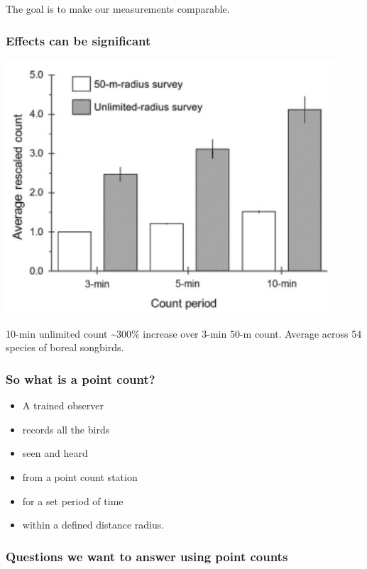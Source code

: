 \documentclass[12pt,]{book}
\providecommand{\tightlist}{%
  \setlength{\itemsep}{0pt}\setlength{\parskip}{0pt}}
\begin{document}
The goal is to make our measurements comparable.

\hypertarget{effects-can-be-significant}{%
\subsubsection{Effects can be significant}\label{effects-can-be-significant}}

\includegraphics[width=4.82in]{./images/matsuoka-2014-fig-2}

10-min unlimited count \textasciitilde{}300\% increase over 3-min 50-m count.
Average across 54 species of boreal songbirds.

\hypertarget{so-what-is-a-point-count}{%
\subsubsection{So what is a point count?}\label{so-what-is-a-point-count}}

\begin{itemize}
\tightlist
\item
  A trained observer
\item
  records all the birds
\item
  seen and heard
\item
  from a point count station
\item
  for a set period of time
\item
  within a defined distance radius.
\end{itemize}

\hypertarget{questions-we-want-to-answer-using-point-counts}{%
\subsubsection{Questions we want to answer using point counts}\label{questions-we-want-to-answer-using-point-counts}}
\end{document}
